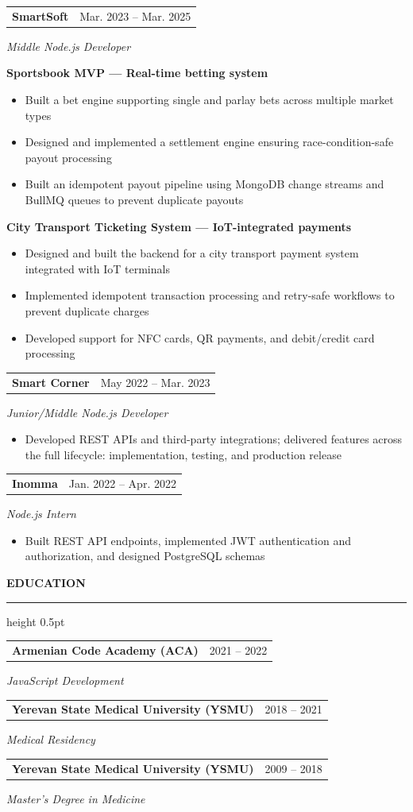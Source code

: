 \documentclass[a4paper]{article}
\makeatletter
\newcommand{\sectionTitle}[1]{%
  \vspace{9pt}%
  {\fontsize{9.5pt}{11.5pt}\selectfont\bfseries #1\par}%
  \vspace{3pt}%
  \hrule height 0.5pt%
  \vspace{7.84pt}%
}
\newcommand{\company}[2]{%
	\begin{tabularx}{\textwidth}{@{}Xr@{}}
		{\fontsize{9.5pt}{11.5pt}\selectfont\bfseries #1} &
		{\fontsize{9pt}{11pt}\selectfont\color{dategray} #2} \\
	\end{tabularx}%
	\vspace{0pt}%
}
\newcommand{\jobProject}[1]{%
  {\leftskip=6pt\fontsize{8.5pt}{10pt}\selectfont\bfseries #1\par}%
  \vspace{1.7pt}%
}
\newcommand{\role}[1]{%
  {\fontsize{9pt}{10.5pt}\selectfont\itshape\color{dategray} #1\par}%
  \vspace{1.7pt}%
}
\newenvironment{dashBullets}{%
  \begin{itemize}[
    leftmargin=16.2pt,
    label={\textendash},
    itemsep=0.9pt,
    topsep=0pt,
    parsep=0pt,
    partopsep=0pt
  ]%
  \fontsize{8.5pt}{9.9pt}\selectfont
}{%
  \end{itemize}%
}
\newcommand{\educationHeader}[2]{%
  \begin{tabularx}{\textwidth}{@{}Xr@{}}
    {\fontsize{9.5pt}{11.5pt}\selectfont\bfseries #1} &
    {\fontsize{9pt}{11pt}\selectfont\color{dategray} #2} \\
  \end{tabularx}%
  \vspace{0pt}%
}
\makeatother
\begin{document}
\vspace{5.07pt}

\company{SmartSoft}{Mar. 2023 – Mar. 2025}
\role{Middle Node.js Developer}
\jobProject{Sportsbook MVP — Real-time betting system}
\begin{dashBullets}
  \item Built a bet engine supporting single and parlay bets across multiple market types
  \item Designed and implemented a settlement engine ensuring race-condition-safe payout processing
  \item Built an idempotent payout pipeline using MongoDB change streams and BullMQ queues to prevent duplicate payouts
\end{dashBullets}

\vspace{4.0pt}

\jobProject{City Transport Ticketing System — IoT-integrated payments}
\begin{dashBullets}
  \item Designed and built the backend for a city transport payment system integrated with IoT terminals
  \item Implemented idempotent transaction processing and retry-safe workflows to prevent duplicate charges
  \item Developed support for NFC cards, QR payments, and debit/credit card processing
\end{dashBullets}

\vspace{5.07pt}
\company{Smart Corner}{May 2022 – Mar. 2023}
\role{Junior/Middle Node.js Developer}
\begin{dashBullets}
	\item Developed REST APIs and third-party integrations; delivered features across the full lifecycle: implementation, testing, and production release
\end{dashBullets}

\vspace{5.07pt}
\company{Inomma}{Jan. 2022 – Apr. 2022}
\role{Node.js Intern}
\begin{dashBullets}
  \item Built REST API endpoints, implemented JWT authentication and authorization, and designed PostgreSQL schemas
\end{dashBullets}

\sectionTitle{EDUCATION}
\educationHeader{Armenian Code Academy (ACA)}{2021 – 2022}
{\fontsize{9pt}{10.5pt}\selectfont\itshape\color{dategray}JavaScript Development\par}%
\vspace{4.0pt}%
\educationHeader{Yerevan State Medical University (YSMU)}{2018 – 2021}
{\fontsize{9pt}{10.5pt}\selectfont\itshape\color{dategray}Medical Residency\par}%
\vspace{4.0pt}%
\educationHeader{Yerevan State Medical University (YSMU)}{2009 – 2018}
{\fontsize{9pt}{10.5pt}\selectfont\itshape\color{dategray}Master's Degree in Medicine\par}%
\end{document}
